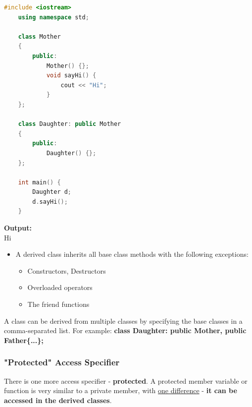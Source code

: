 \documentclass[12pt , a4paper]{article}
\newcommand{\hl}[1]{\colorbox{coolblack}{\color{cream}\textbf{#1}\color{black}}}
\begin{document}
	\begin{lstlisting}[language=C++]
	#include <iostream>
	using namespace std;
	
	class Mother
	{
	    public:
	        Mother() {};
	        void sayHi() {
	            cout << "Hi";
	        }
	};
	
	class Daughter: public Mother
	{
	    public:
	        Daughter() {};
	};
	
	int main() {
	    Daughter d;
	    d.sayHi();
	}

	\end{lstlisting}

	\begin{tcolorbox}
	\textbf{Output:}\\
	Hi
	\end{tcolorbox}
	\begin{importantBox}
		\begin{itemize}
			\item A derived class inherits all base class methods with the following exceptions:
			\begin{itemize}
				\item Constructors, Destructors
				\item Overloaded operators
				\item The friend functions
			\end{itemize}
		\end{itemize}
	\end{importantBox}
A class can be derived from multiple classes by specifying the base classes in a comma-separated list. For example: \hl{class Daughter: public Mother, public Father\{...\};}
	\subsubsection{"Protected" Access Specifier}
	There is one more access specifier - \textbf{protected}.
	A protected member variable or function is very similar to a private member, with \underline{one difference} -  \textbf{it can be accessed in the derived classes}.
\end{document}
